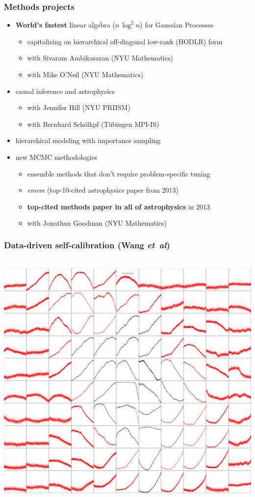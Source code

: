 \documentclass[aspectratio=169]{beamer}
\newcommand{\foreign}[1]{\textsl{#1}}
\newcommand{\etal}{\foreign{et~al}}
\renewcommand{\emph}[1]{\textbf{#1}}
\newcommand{\project}[1]{\textsl{#1}}
\begin{document}
\begin{frame}
  \frametitle<1>{Methods projects}
  \begin{itemize}
  \item \emph{World's fastest} linear algebra ($n\,\log^2n$) for Gaussian Processes
    \begin{itemize}
    \item capitalizing on hierarchical off-diagonal low-rank (HODLR) form
    \item with Sivaram Ambikasaran (NYU Mathematics)
    \item with Mike O'Neil (NYU Mathematics)
    \end{itemize}
  \item causal inference and astrophysics
    \begin{itemize}
    \item with Jennifer Hill (NYU PRIISM)
    \item with Bernhard Sch\"olkpf (T\"ubingen MPI-IS)
    \end{itemize}
  \item hierarchical modeling with importance sampling
  \item new MCMC methodologies
    \begin{itemize}
    \item ensemble methods that don't require problem-specific tuning
    \item \project{emcee} (top-10-cited astrophysics paper from 2013)
    \item \emph{top-cited methods paper in all of astrophysics} in 2013
    \item with Jonathan Goodman (NYU Mathematics)
    \end{itemize}
  \end{itemize}
\end{frame}

\begin{frame}
  \frametitle{Data-driven self-calibration \small{(Wang \etal)}}
  ~\hfill\includegraphics[height=0.85\textheight]{kic_03544595_05_pixels.png}
\end{frame}
\end{document}
